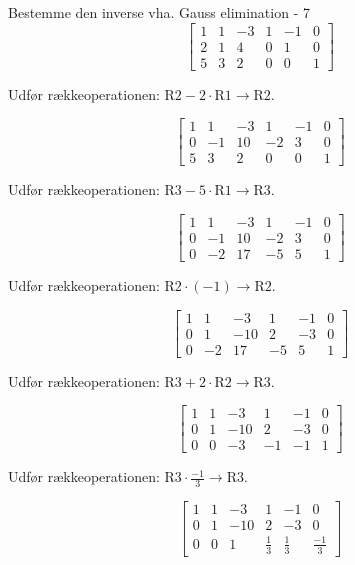 \documentclass{article}
\begin{document}
\begin{exercise}{Bestemme den inverse vha. Gauss elimination - 7}
	\hint
	\[
	\left[\begin{array}{ccc|ccc}
	1 & 1 & -3 & 1 & -1 & 0 \\ 
	2 & 1 & 4 & 0 & 1 & 0 \\
	5 & 3 & 2 & 0 & 0 & 1 
	\end{array} \right]
	\]
	
	\hint
	Udfør rækkeoperationen: $\text{R2} - 2 \cdot \text{R1} \to \text{R2}$.
	
	\hint
	\[
	\left[\begin{array}{ccc|ccc}
	1 & 1 & -3 & 1 & -1 & 0 \\ 
	0 & -1 & 10 & -2 & 3 & 0 \\
	5 & 3 & 2 & 0 & 0 & 1 
	\end{array} \right]
	\]
	
	\hint
	Udfør rækkeoperationen: $\text{R3} - 5 \cdot  \text{R1} \to \text{R3}$.
	
	\hint
	\[
	\left[\begin{array}{ccc|ccc}
	1 & 1 & -3 & 1 & -1 & 0 \\ 
	0 & -1 & 10 & -2 & 3 & 0 \\
	0 & -2 & 17 & -5 & 5 & 1 
	\end{array} \right]
	\]
	
	\hint
	Udfør rækkeoperationen: $\text{R2} \cdot (-1) \to \text{R2}$.
	
	\hint
	\[
	\left[\begin{array}{ccc|ccc}
	1 & 1 & -3 & 1 & -1 & 0 \\ 
	0 & 1 & -10 & 2 & -3 & 0 \\
	0 & -2 & 17 & -5 & 5 & 1 
	\end{array} \right]
	\]
	
	\hint
	Udfør rækkeoperationen: $\text{R3} + 2 \cdot \text{R2} \to \text{R3}$.
	
	\hint
	\[
	\left[\begin{array}{ccc|ccc}
	1 & 1 & -3 & 1 & -1 & 0 \\ 
	0 & 1 & -10 & 2 & -3 & 0 \\
	0 & 0 & -3 & -1 & -1 & 1 
	\end{array} \right]
	\]
	
	\hint
	Udfør rækkeoperationen: $\text{R3} \cdot \frac{-1}{3}  \to \text{R3}$.
	
	\hint
	\[
	\left[\begin{array}{ccc|ccc}
	1 & 1 & -3 & 1 & -1 & 0 \\ 
	0 & 1 & -10 & 2 & -3 & 0 \\
	0 & 0 & 1 & \frac{1}{3} & \frac{1}{3} & \frac{-1}{3}
	\end{array} \right]
	\]
	

\end{exercise}
\end{document}
